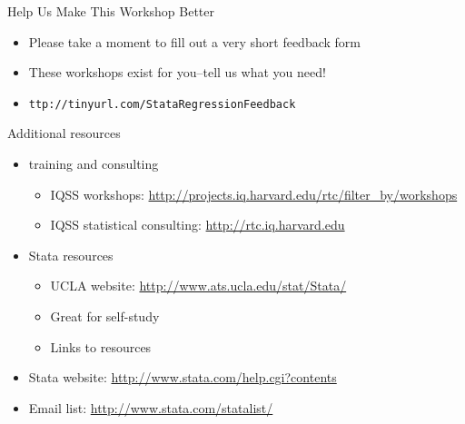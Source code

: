 \documentclass[table,smaller]{beamer}
\begin{document}
\begin{frame}[label=sec-6-1]{Help Us Make This Workshop Better}
\begin{itemize}
\item Please take a moment to fill out a very short feedback form
\item These workshops exist for you--tell us what you need!
\item \texttt{ttp://tinyurl.com/StataRegressionFeedback}
\end{itemize}
\end{frame}
\begin{frame}[label=sec-6-2]{Additional resources}
\begin{itemize}
\item training and consulting
\begin{itemize}
\item IQSS workshops: \url{http://projects.iq.harvard.edu/rtc/filter_by/workshops}
\item IQSS statistical consulting: \url{http://rtc.iq.harvard.edu}
\end{itemize}

\item Stata resources
\begin{itemize}
\item UCLA website: \url{http://www.ats.ucla.edu/stat/Stata/}
\item Great for self-study
\item Links to resources
\end{itemize}
\item Stata website: \url{http://www.stata.com/help.cgi?contents}
\item Email list: \url{http://www.stata.com/statalist/}
\end{itemize}
\end{frame}
\end{document}
